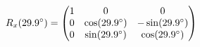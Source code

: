\documentclass[preview]{standalone}
\begin{document}
\begin{align*}
\special{dvisvgm:raw <g id='unique000'>}R_x(29.9^\circ) = \begin{pmatrix} 1 & 0 & 0 \\ 0 & \cos(29.9^\circ) & -\sin(29.9^\circ) \\ 0 & \sin(29.9^\circ) & \cos(29.9^\circ) \end{pmatrix}\special{dvisvgm:raw </g>}
\end{align*}
\end{document}
